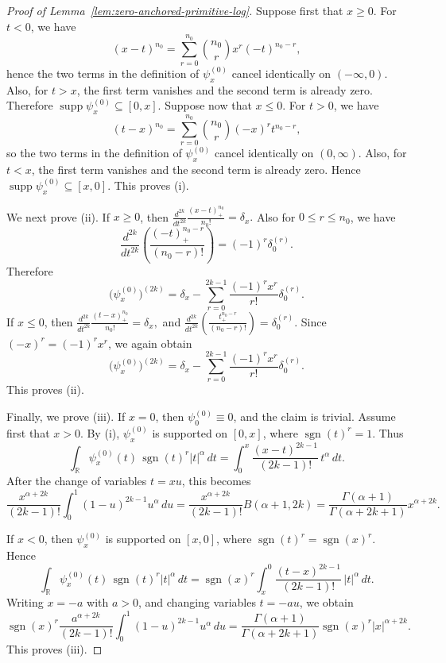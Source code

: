 \documentclass[11pt]{article}
\theoremstyle{definition}
\begin{document}
\begin{proof}[Proof of Lemma~\ref{lem:zero-anchored-primitive-log}]
    Suppose first that $x\ge 0$. For $t<0$, we have
\[
(x-t)^{n_0}
=
\sum_{r=0}^{n_0}\binom{n_0}{r}x^r(-t)^{n_0-r},
\]
hence the two terms in the definition of $\psi_x^{(0)}$ cancel identically on
$(-\infty,0)$. Also, for $t>x$, the first term vanishes and the second term is
already zero. Therefore
\(
\operatorname{supp}\psi_x^{(0)}\subseteq [0,x].
\)
Suppose now that $x\le 0$. For $t>0$, we have
\[
(t-x)^{n_0}
=
\sum_{r=0}^{n_0}\binom{n_0}{r}(-x)^r t^{n_0-r},
\]
so the two terms in the definition of $\psi_x^{(0)}$ cancel identically on
$(0,\infty)$. Also, for $t<x$, the first term vanishes and the second term is
already zero. Hence
\(
\operatorname{supp}\psi_x^{(0)}\subseteq [x,0].
\)
This proves \textnormal{(i)}.

We next prove \textnormal{(ii)}. If $x\ge 0$, then
\(
\frac{d^{2k}}{dt^{2k}}\frac{(x-t)_+^{n_0}}{n_0!}=\delta_x.
\)
Also for $0\le r\le n_0$, we have
\[
\frac{d^{2k}}{dt^{2k}}
\left(
\frac{(-t)_+^{n_0-r}}{(n_0-r)!}
\right)
=
(-1)^r\delta_0^{(r)}.
\]
Therefore
\[
\bigl(\psi_x^{(0)}\bigr)^{(2k)}
=
\delta_x-\sum_{r=0}^{2k-1}\frac{(-1)^r x^r}{r!}\delta_0^{(r)}.
\]
If $x\le 0$, then
\(
\frac{d^{2k}}{dt^{2k}}\frac{(t-x)_+^{n_0}}{n_0!}=\delta_x,
\)
and
\(
\frac{d^{2k}}{dt^{2k}}
\left(
\frac{t_+^{n_0-r}}{(n_0-r)!}
\right)
=
\delta_0^{(r)}.
\)
Since $(-x)^r=(-1)^r x^r$, we again obtain
\[
\bigl(\psi_x^{(0)}\bigr)^{(2k)}
=
\delta_x-\sum_{r=0}^{2k-1}\frac{(-1)^r x^r}{r!}\delta_0^{(r)}.
\]
This proves \textnormal{(ii)}.

Finally, we prove \textnormal{(iii)}. If $x=0$, then $\psi_0^{(0)}\equiv 0$, and the
claim is trivial. Assume first that $x>0$. By \textnormal{(i)}, $\psi_x^{(0)}$ is supported
on $[0,x]$, where $\operatorname{sgn}(t)^r=1$. Thus
\[
\int_{\mathbb R}\psi_x^{(0)}(t)\,\operatorname{sgn}(t)^r |t|^\alpha\,dt
=
\int_0^x \frac{(x-t)^{2k-1}}{(2k-1)!}\, t^\alpha\,dt.
\]
After the change of variables $t=xu$, this becomes
\[
\frac{x^{\alpha+2k}}{(2k-1)!}\int_0^1 (1-u)^{2k-1}u^\alpha\,du
=
\frac{x^{\alpha+2k}}{(2k-1)!}B(\alpha+1,2k)
=
\frac{\Gamma(\alpha+1)}{\Gamma(\alpha+2k+1)}x^{\alpha+2k}.
\]

If $x<0$, then $\psi_x^{(0)}$ is supported on $[x,0]$, where
$\operatorname{sgn}(t)^r=\operatorname{sgn}(x)^r$. Hence
\[
\int_{\mathbb R}\psi_x^{(0)}(t)\,\operatorname{sgn}(t)^r |t|^\alpha\,dt
=
\operatorname{sgn}(x)^r
\int_x^0 \frac{(t-x)^{2k-1}}{(2k-1)!}\, |t|^\alpha\,dt.
\]
Writing $x=-a$ with $a>0$, and changing variables $t=-au$, we obtain
\[
\operatorname{sgn}(x)^r
\frac{a^{\alpha+2k}}{(2k-1)!}
\int_0^1 (1-u)^{2k-1}u^\alpha\,du
=
\frac{\Gamma(\alpha+1)}{\Gamma(\alpha+2k+1)}
\operatorname{sgn}(x)^r |x|^{\alpha+2k}.
\]
This proves \textnormal{(iii)}.
\end{proof}
\end{document}
